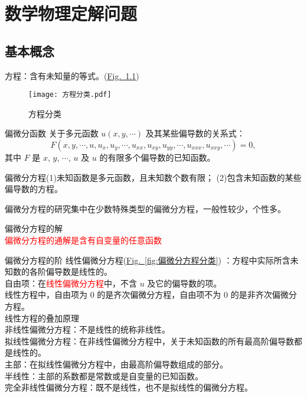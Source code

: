 \documentclass[12pt, a4paper, oneside, UTF8]{ctexbook}
\begin{document}
% 
\else
\fi

\chapter{数学物理定解问题}

\section{基本概念}

方程：含有未知量的等式。(\hyperref[fig:方程分类]{Fig.~\ref{fig:方程分类}})

\begin{figure}
    \centering
    \texttt{[image: 方程分类.pdf]} 
    \caption{\label{fig:方程分类} 方程分类}
\end{figure}
\begin{defn}{偏微分函数}{}
    关于多元函数 $ u(x,y,\cdots) $ 及其某些偏导数的关系式：
    \[ 
        F(x, y, \cdots, u, u_x, u_y, \cdots, u_{xx}, u_{xy}, u_{yy}, \cdots, 
        u_{xxx}, u_{xxy},\cdots) = 0, 
    \]
    其中 $F$ 是 $x$, $y$, $\cdots$, $u$ 及 $u$ 的有限多个偏导数的已知函数。
\end{defn}
\begin{rmk}{}
    偏微分方程(1)未知函数是多元函数，且未知数个数有限；
    (2)包含未知函数的某些偏导数的方程。
\end{rmk}

偏微分方程的研究集中在少数特殊类型的偏微分方程，一般性较少，个性多。

偏微分方程的解  \\
\textcolor{red}{偏微分方程的通解是含有自变量的任意函数}

偏微分方程的阶
\noindent 线性偏微分方程(\hyperref[fig:偏微分方程分类]{Fig.~\ref{fig:偏微分方程分类}})
：方程中实际所含未知数的各阶偏导数是线性的。  \\
自由项：在\textcolor{red}{线性偏微分方程}中，不含 $u$ 及它的偏导数的项。  \\
线性方程中，自由项为 0 的是齐次偏微分方程，自由项不为 0 的是非齐次偏微分方程。  \\
线性方程的叠加原理  \\
非线性偏微分方程：不是线性的统称非线性。  \\
拟线性偏微分方程：在非线性偏微分方程中，关于未知函数的所有最高阶偏导数都是线性的。  \\
主部：在拟线性偏微分方程中，由最高阶偏导数组成的部分。  \\
半线性：主部的系数都是常数或是自变量的已知函数。  \\
完全非线性偏微分方程：既不是线性，也不是拟线性的偏微分方程。
\end{document}
